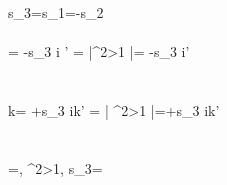 \\
s_3=s_1=-s_2
\\\\
{\omega}= -s_3  i \omega' = \left |\beta^2\textgreater 1 \right |=
-s_3 \frac {\beta}{\left | \beta \right |} \sqrt{} i\omega'
\\
\\
\\
{k}= +s_3  ik' = \left | \beta^2\textgreater 1 \right |=+s_3 \frac {\beta}{\left | \beta \right |} \sqrt{} ik'
\\
\\
\\
\beta=, \beta^2\textgreater 1, s_3= 

